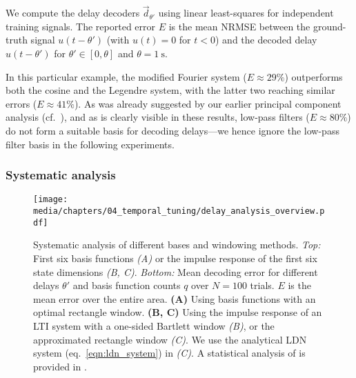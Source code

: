 We compute the delay decoders $\vec d_{\theta'}$ using linear least-squares for independent training signals.
The reported error $E$ is the mean NRMSE between the ground-truth signal $u(t - \theta')$ (with $u(t) = 0$ for $t < 0$) and the decoded delay $\hat u(t - \theta')$ for $\theta' \in [0, \theta]$ and $\theta = \SI{1}{\second}$.

In this particular example, the modified Fourier system ($E \approx 29\%$) outperforms both the cosine and the Legendre system, with the latter two reaching similar errors ($E \approx 41\%$).
As was already suggested by our earlier principal component analysis (cf.~), and as is clearly visible in these results, low-pass filters ($E \approx 80\%$) do not form a suitable basis for decoding delays---we hence ignore the low-pass filter basis in the following experiments.

\subsubsection{Systematic analysis}

\begin{figure}[p]
	\centering
	\texttt{[image: media/chapters/04\_temporal\_tuning/delay\_analysis\_overview.pdf]}%
	{\label{fig:delay_analysis_overview_a}}%
	{\label{fig:delay_analysis_overview_b}}%
	{\label{fig:delay_analysis_overview_c}}%
	\caption[Systematic analysis of different bases and windowing methods]{Systematic analysis of different bases and windowing methods. \emph{Top:} First six basis functions \emph{(A)} or the impulse response of the first six state dimensions \emph{(B, C)}. \emph{Bottom:} Mean decoding error for different delays $\theta'$ and basis function counts $q$ over $N = 100$ trials.
	$E$ is the mean error over the entire area.
	\textbf{(A)} Using basis functions with an optimal rectangle window.
	\textbf{(B, C)} Using the impulse response of an LTI system with a one-sided Bartlett window \emph{(B)}, or the approximated rectangle window \emph{(C)}.
	We use the analytical LDN system (eq.~\ref{eqn:ldn_system}) in \emph{(C)}.
	A statistical analysis of is provided in .
	}
	\label{fig:delay_analysis_overview}
\end{figure}

